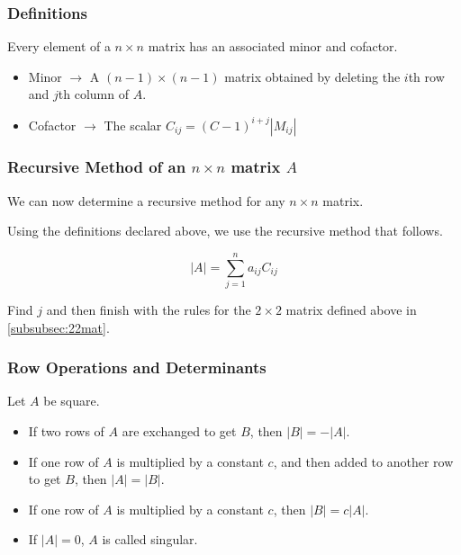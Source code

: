 \documentclass[12pt,landscape,twocolumn]{article}
\begin{document}
        \subsubsection{Definitions}
        Every element of a $n \times n$ matrix has an associated minor and cofactor.

        \begin{itemize}
        \item Minor $\to$ A $(n - 1) \times (n - 1)$ matrix obtained by deleting the $i$th row and $j$th column of $A$.
        \item Cofactor $\to$ The scalar $C_{ij} = (C - 1)^{i+j} \left| M_{ij} \right|$
        \end{itemize}

        \subsubsection{Recursive Method of an $n \times n$ matrix $A$}
        We can now determine a recursive method for any $n \times n$ matrix.

        Using the definitions declared above, we use the recursive method that follows.

        \begin{equation}\label{eq:detrec}
        \left| A \right| = \sum_{j=1}^n a_{ij} C_{ij}
        \end{equation}

        Find $j$ and then finish with the rules for the $2 \times 2$ matrix defined above in \eqref{subsubsec:22mat}.

        \subsubsection{Row Operations and Determinants}
        Let $A$ be square.

        \begin{itemize}
        \item If two rows of $A$ are exchanged to get $B$, then $|B| = -|A|$.
        \item If one row of $A$ is multiplied by a constant $c$, and then added to another row to get $B$, then $|A| = |B|$.
        \item If one row of $A$ is multiplied by a constant $c$, then $|B| = c|A|$.
        \item If $|A| = 0$, $A$ is called singular.
        \end{itemize}
\end{document}
